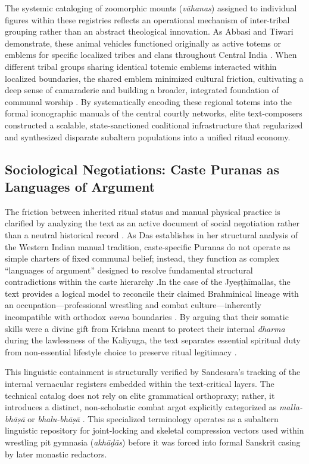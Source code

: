 \documentclass[11pt,twoside,letterpaper]{article}
\begin{document}
The systemic cataloging of zoomorphic mounts (\textit{vāhanas}) assigned to individual figures within these registries reflects an operational mechanism of inter-tribal grouping rather than an abstract theological innovation. As Abbasi and Tiwari demonstrate, these animal vehicles functioned originally as active totems or emblems for specific localized tribes and clans throughout Central India \citep{Abbasi2001}. When different tribal groups sharing identical totemic emblems interacted within localized boundaries, the shared emblem minimized cultural friction, cultivating a deep sense of camaraderie and building a broader, integrated foundation of communal worship \citep{Abbasi2001}. By systematically encoding these regional totems into the formal iconographic manuals of the central courtly networks, elite text-composers constructed a scalable, state-sanctioned coalitional infrastructure that regularized and synthesized disparate subaltern populations into a unified ritual economy.

\subsection{Sociological Negotiations: Caste Puranas as Languages of Argument}The friction between inherited ritual status and manual physical practice is clarified by analyzing the text as an active document of social negotiation rather than a neutral historical record \citep{Das1968}. As Das establishes in her structural analysis of the Western Indian manual tradition, caste-specific Puranas do not operate as simple charters of fixed communal belief; instead, they function as complex ``languages of argument'' designed to resolve fundamental structural contradictions within the caste hierarchy \citep{Das1968}.In the case of the Jyeṣṭhīmallas, the text provides a logical model to reconcile their claimed Brahminical lineage with an occupation—professional wrestling and combat culture—inherently incompatible with orthodox \textit{varna} boundaries \citep{Das1968}. By arguing that their somatic skills were a divine gift from Krishna meant to protect their internal \textit{dharma} during the lawlessness of the Kaliyuga, the text separates essential spiritual duty from non-essential lifestyle choice to preserve ritual legitimacy \citep{Das1968}.

This linguistic containment is structurally verified by Sandesara’s tracking of the internal vernacular registers embedded within the text-critical layers. The technical catalog does not rely on elite grammatical orthopraxy; rather, it introduces a distinct, non-scholastic combat argot explicitly categorized as \textit{malla-bhāṣā} or \textit{bhalu-bhāṣā} \citep{Sandesara1948}. This specialized terminology operates as a subaltern linguistic repository for joint-locking and skeletal compression vectors used within wrestling pit gymnasia (\textit{akhāḍās}) before it was forced into formal Sanskrit casing by later monastic redactors.
\end{document}
